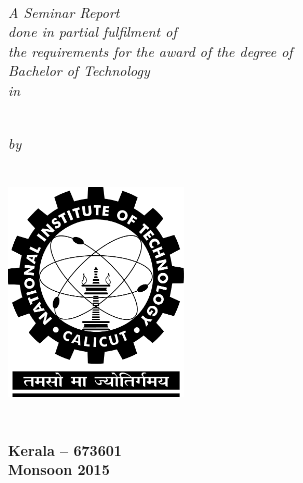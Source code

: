 \begin{titlepage}
\begin{center}

\huge \textbf {\myTopic{}}\\[1.5cm]

\small
	\emph{A Seminar Report\\
	done in partial fulfilment of\\
	the requirements for the award of the degree of}\\[0.5cm]

\large \emph{Bachelor of Technology}\\
\small \emph{in}\par
\large \emph{\myBranchName{}}\\[0.5cm]

\Large \emph{by}\\[1cm]

\small \textbf{\myName{}\\
	\myRollNo{}}

\vfill

\includegraphics[width=0.35\textwidth]{./nitc-logo.png}\\[1.5cm]
\large \textbf{\myDeptName{}}\\
\Large \textbf{\myCollegeName{}}\\

\small \textbf{Kerala -- 673601\\
		Monsoon 2015}

\end{center}
\end{titlepage}
